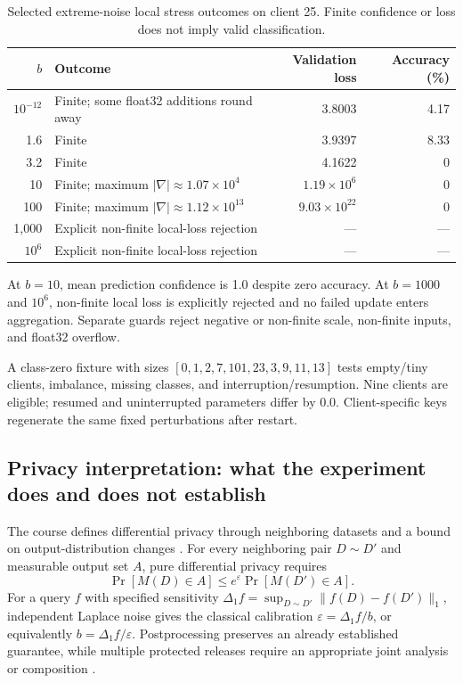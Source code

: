 \begin{table}[htbp]
\centering
\caption{Selected extreme-noise local stress outcomes on client 25. Finite confidence or loss does not imply valid classification.}\label{tab:stress}
\begin{tabularx}{\linewidth}{rYrr}
\toprule
$b$ & Outcome & Validation loss & Accuracy (\%)\\
\midrule
$10^{-12}$ & Finite; some float32 additions round away & 3.8003 & 4.17\\
1.6 & Finite & 3.9397 & 8.33\\
3.2 & Finite & 4.1622 & 0\\
10 & Finite; maximum $|\nabla|\approx1.07\times10^4$ & $1.19\times10^6$ & 0\\
100 & Finite; maximum $|\nabla|\approx1.12\times10^{13}$ & $9.03\times10^{22}$ & 0\\
1,000 & Explicit non-finite local-loss rejection & --- & ---\\
$10^6$ & Explicit non-finite local-loss rejection & --- & ---\\
\bottomrule
\end{tabularx}
\end{table}

At $b=10$, mean prediction confidence is 1.0 despite zero accuracy. At $b=1000$ and $10^6$, non-finite local loss is explicitly rejected and no failed update enters aggregation. Separate guards reject negative or non-finite scale, non-finite inputs, and float32 overflow.

A class-zero fixture with sizes $[0,1,2,7,101,23,3,9,11,13]$ tests empty/tiny clients, imbalance, missing classes, and interruption/resumption. Nine clients are eligible; resumed and uninterrupted parameters differ by 0.0. Client-specific keys regenerate the same fixed perturbations after restart.


\subsection{Privacy interpretation: what the experiment does and does not establish}\label{sec:privacy}
The course defines differential privacy through neighboring datasets and a bound on output-distribution changes \citep{courseDP}. For every neighboring pair $D\sim D'$ and measurable output set $A$, pure differential privacy requires
\begin{equation}
\Pr[M(D)\in A]\le e^{\varepsilon}\Pr[M(D')\in A].\label{eq:dp}
\end{equation}
For a query $f$ with specified sensitivity $\Delta_1f=\sup_{D\sim D'}\|f(D)-f(D')\|_1$, independent Laplace noise gives the classical calibration $\varepsilon=\Delta_1f/b$, or equivalently $b=\Delta_1f/\varepsilon$. Postprocessing preserves an already established guarantee, while multiple protected releases require an appropriate joint analysis or composition \citep{dworkroth2014}.

